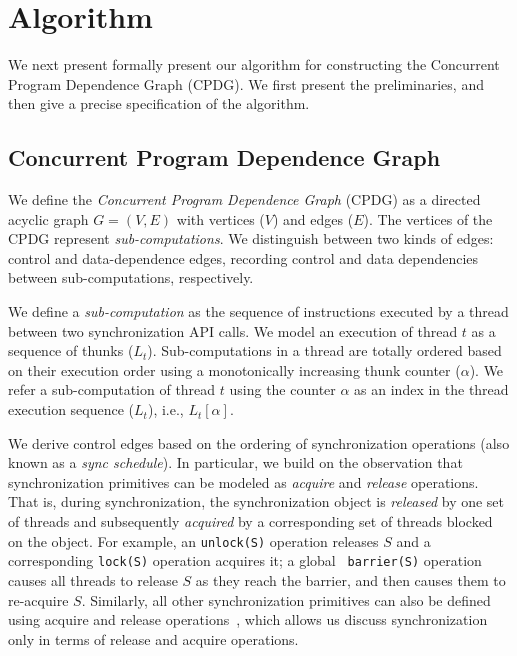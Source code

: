 \section{Algorithm}
\label{sec:algorithms}

We next present formally present our algorithm for constructing the Concurrent Program Dependence Graph (CPDG). We first present the preliminaries,
and then give a precise specification of the algorithm.



\subsection{Concurrent Program Dependence Graph}  We define the {\em
Concurrent Program Dependence Graph} (CPDG)  as a directed acyclic graph $G =
(V,E)$ with vertices ($V$) and edges ($E$). The
vertices of the CPDG represent {\em sub-computations}. We distinguish between two kinds of edges: control and data-dependence edges, recording control and data dependencies between sub-computations, respectively. 


 We define a {\em sub-computation}  as the sequence of instructions
executed by a thread between two \pthreads synchronization API calls. We model an execution of thread $t$ as a sequence of thunks
($L_t$). Sub-computations in a thread are totally ordered based on their execution order
using a monotonically increasing thunk counter ($\alpha$). We refer a sub-computation of thread $t$ using the counter $\alpha$ as an index in the thread execution sequence ($L_t$), i.e., $L_t[\alpha]$. 

 We derive control edges based on the ordering of synchronization operations (also known as a {\em sync schedule}). In particular,  we build on the observation that synchronization primitives can be modeled as {\em acquire} and {\em release} operations. That is,   during synchronization, the synchronization object is {\em released} by one set of threads and subsequently  {\em acquired} by a corresponding set of threads blocked on the object. For example, an {\tt unlock(S)} operation releases $S$
and a corresponding {\tt lock(S)} operation acquires it; a global {\tt
barrier(S)} operation causes all threads to release $S$ as they reach the
barrier, and then causes them to re-acquire $S$. Similarly, all other
synchronization primitives can also be defined using acquire and release
operations~\cite{djit, fast-track-pldi}, which allows us discuss synchronization only in terms of release and acquire operations.


